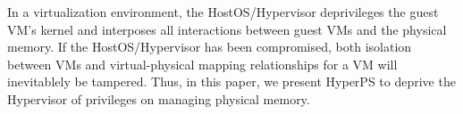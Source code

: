 
In a virtualization environment, the HostOS/Hypervisor deprivileges the guest VM’s kernel and interposes all interactions between guest VMs and the physical memory. 
If the HostOS/Hypervisor has been compromised, both isolation between VMs and virtual-physical mapping relationships for a VM will inevitablely be tampered. 
Thus, in this paper, we present HyperPS to deprive the Hypervisor of privileges on managing physical memory.


